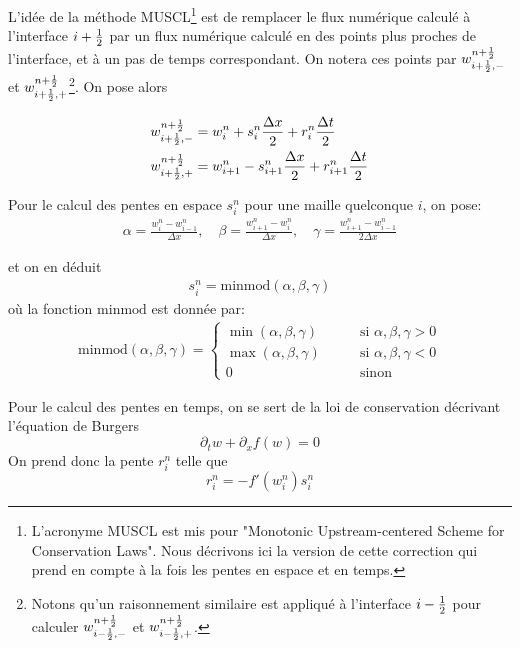 \documentclass[
	french,
	11pt, %
]{fphw}
\begin{document}
L'idée de la méthode MUSCL\footnote{L'acronyme MUSCL est mis pour "Monotonic Upstream-centered Scheme for Conservation Laws". Nous décrivons ici la version de cette correction qui prend en compte à la fois les pentes en espace et en temps.} est de remplacer le flux numérique calculé à l'interface $i+\frac{1}{2}$ par un flux numérique calculé en des points plus proches de l'interface, et à un pas de temps correspondant. On notera ces points par $w^{n+\frac{1}{2}}_{i+\frac{1}{2},-}$ et $w^{n+\frac{1}{2}}_{i+\frac{1}{2},+}$\footnote{Notons qu'un raisonnement similaire est appliqué à l'interface $i-\frac{1}{2}$ pour calculer $w^{n+\frac{1}{2}}_{i-\frac{1}{2},-}$ et $w^{n+\frac{1}{2}}_{i-\frac{1}{2},+}$.}. On pose alors

\begin{equation}	
	\label{eq:muscl}
	\begin{aligned}
		w^{n+\frac{1}{2}}_{i+\frac{1}{2},-} &= w^n_i + s^n_i \frac{\Delta x}{2} + r^n_i \frac{\Delta t}{2} \\
		w^{n+\frac{1}{2}}_{i+\frac{1}{2},+} &= w^n_{i+1} - s^n_{i+1} \frac{\Delta x}{2} + r^n_{i+1} \frac{\Delta t}{2}
	\end{aligned}
\end{equation}

Pour le calcul des pentes en espace $s^n_i$ pour une maille quelconque $i$, on pose:
\begin{align*}
	\alpha = \frac{w^n_{i} - w^n_{i-1}}{\Delta x}, \quad
	\beta = \frac{w^n_{i+1} - w^n_{i}}{\Delta x}, \quad
	\gamma = \frac{w^n_{i+1} - w^n_{i-1}}{2\Delta x}
\end{align*}

et on en déduit
\begin{align*}
	s^n_{i} = \text{minmod}(\alpha, \beta, \gamma)
\end{align*}
où la fonction $\text{minmod}$ est donnée par:
\begin{align*}
	\text{minmod}(\alpha, \beta, \gamma) = 
	\begin{cases}
		\min(\alpha, \beta, \gamma) \qquad &\text{si  } \alpha,\beta,\gamma > 0 \\
		\max(\alpha, \beta, \gamma) \qquad &\text{si  } \alpha,\beta,\gamma < 0 \\
		0 \qquad &\text{sinon  }
	\end{cases}
\end{align*}

Pour le calcul des pentes en temps, on se sert de la loi de conservation décrivant l'équation de Burgers 
$$
\partial_t w + \partial_x f(w) = 0
$$
On prend donc la pente $r^n_i$ telle que 
$$
r^n_i = - f'(w^n_i) s^n_{i} 
$$ 
\end{document}

